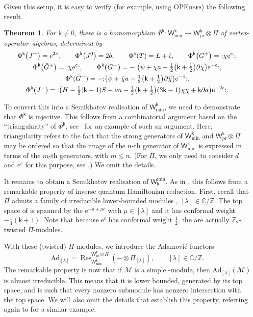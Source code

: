 \documentclass[pdftex]{sigma}
\numberwithin{equation}{section}
\newcommand{\pd}{\partial} %
\newcommand{\bchi}{\bar{\chi}{}} %
\newcommand{\bpsi}{\bar{\psi}{}} %
\newcommand{\bG}{\bar{G}{}}
\newcommand{\ee}{\mathrm{e}} %
\newcommand{\kk}{\mathsf{k}} %
\renewcommand{\le}{\leqslant} %
\DeclarePairedDelimiter{\brac}{\lparen}{\rparen} %
\newcommand{\no}[1]{\mathopen{:} #1 \mathclose{:}} %
\newcommand{\blank}{{-}} %
\newcommand{\fld}[1]{\mathbb{#1}} %
\newcommand{\VOA}[1]{\mathsf{#1}} %
\newcommand{\Mod}[1]{\mathcal{#1}} %
\newcommand{\categ}[1]{\mathrm{#1}} %
\newcommand{\ZZ}{\fld{Z}}
\newcommand{\CC}{\fld{C}}
\newcommand{\lsymb}{\Pi}
\newcommand{\lvoa}{\lsymb} %
\newcommand{\uwalg}[2]{\VOA{W}^{#1}_{\mathrm{#2}}} %
\newcommand{\swalg}[2]{\VOA{W}_{#1}^{\mathrm{#2}}} %
\newcommand{\upr}[1][\kk]{\uwalg{#1}{pr}} %
\newcommand{\umin}[1][\kk]{\uwalg{#1}{min}} %
\newcommand{\smin}[1][\kk]{\swalg{#1}{min}} %
\newcommand{\lmod}[1]{\lsymb_{[#1]}} %
\newcommand{\adfunc}[1]{\categ{Ad}_{[#1]}}
\DeclareMathOperator{\res}{\categ{Res}}
\newcommand{\vo}{vertex-operator}
\newcommand{\voa}{\vo\ algebra}
\newcommand{\voas}{\voa s}
\newcommand{\qhr}{quantum Hamiltonian reduction} %
\newtheorem{Theorem}{Theorem}[section]
\begin{document}
Given this setup, it is easy to verify (for example, using \textsc{OPEdefs}) the following result.
%
\begin{Theorem} \label{thm:usemi}
	For $\kk \neq 0$, there is a homomorphism $\Phi^{\kk} \colon \umin \to \upr \otimes \lvoa$ of \voas, determined by
	\begin{gather}
			\Phi^{\kk}\big(J^+\big) = \ee^{2c}, \qquad
			\Phi^{\kk}\big(J^0\big) = 2b, \qquad
			\Phi^{\kk}(T) = L + t, \qquad
			\Phi^{\kk}\big(G^+\big) = \no{\chi \ee^c}, \nonumber \\
			\Phi^{\kk}\big(\bG^+\big) = \no{\bchi \ee^c},\qquad
			\Phi^{\kk}\big(G^-\big) = -\no{\brac[\big]{\psi + \chi a - \tfrac{1}{2}\bigl(\kk+\tfrac{1}{2}\bigr)\pd \chi} \ee^{-c}}, \nonumber \\
			\Phi^{\kk}(\bG^-) = -\no{\brac[\big]{\bpsi + \bchi a - \tfrac{1}{2}\bigl(\kk+\tfrac{1}{2}\bigr)\pd \bchi} \ee^{-c}},\nonumber \\
			\Phi^{\kk}(J^-) = \no{\brac[\big]{H - \tfrac{1}{2}(\kk-1) S - aa - \tfrac{1}{2}\bigl(\kk+\tfrac{1}{2}\bigr)(3\kk-1) \chi \bchi + \kk \pd a} \ee^{-2 c}}.\label{eq:usemi}
		\end{gather}
\end{Theorem}

To convert this into a Semikhatov realisation of $\umin$, we need to demonstrate that $\Phi^{\kk}$ is injective.
This follows from a combinatorial argument based on the ``triangularity'' of $\Phi^{\kk}$, see~\cite{AdaRea20} for an example of such an argument.
Here, triangularity refers to the fact that the strong generators of $\umin$ and $\upr \otimes \lvoa$ may be ordered so that the image of the $n$-th generator of $\umin$ is expressed in terms of the $m$-th generators, with $m \le n$.
(For $\lvoa$, we only need to consider $d$ and $\ee^c$ for this purpose, see \cite{AdaRea20}.)
We omit the details.

It remains to obtain a Semikhatov realisation of $\smin$.
As in \cite{AdaRea20}, this follows from a remarkable property of inverse \qhr.
First, recall \cite{BerRep01} that $\lvoa$ admits a family of irreducible lower-bounded modules
\smash{$
	\lmod{\lambda} = \Pi \ee^{-a+\lambda c}$}, $ [\lambda] \in \CC/\ZZ$.
The top space of \smash{$\lmod{\lambda}$} is spanned by the $\ee^{-a+\mu c}$ with $\mu \in [\lambda]$ and it has conformal weight $-\frac{1}{4}(\kk+1)$.
Note that because $\ee^c$ has conformal weight $\frac{1}{2}$, the \smash{$\lmod{\lambda}$} are actually $\ZZ_2$-twisted $\lvoa$-modules.

With these (twisted) $\lvoa$-modules, we introduce the Adamovi\'{c} functors
\begin{equation} \label{eq:adfunct}
	\adfunc{\lambda} = \res^{\upr \otimes \lvoa}_{\umin} (\blank \otimes \lmod{\lambda}), \qquad [\lambda] \in \CC/\ZZ.
\end{equation}
The remarkable property is now that if $\Mod{M}$ is a simple \smash{$\upr$}-module, then $\adfunc{\lambda}(\Mod{M})$ is almost irreducible.
This means that it is lower bounded, generated by its top space, and is such that every nonzero submodule has nonzero intersection with the top space.
We will also omit the details that establish this property, referring again to \cite{AdaRea20} for a similar example.
\end{document}
